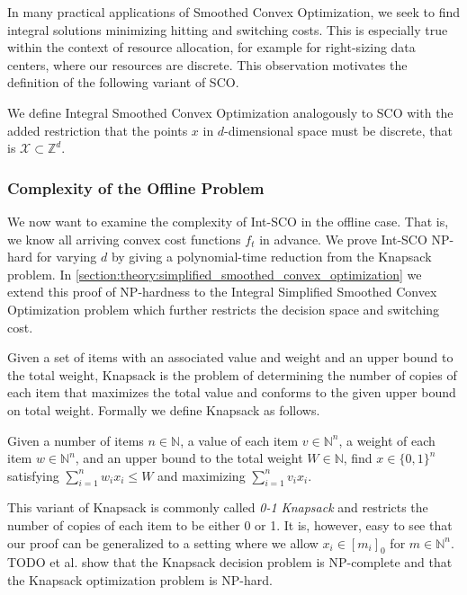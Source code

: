 In many practical applications of Smoothed Convex Optimization, we seek to find integral solutions minimizing hitting and switching costs. This is especially true within the context of resource allocation, for example for right-sizing data centers, where our resources are discrete. This observation motivates the definition of the following variant of SCO.

\begin{problem}
We define Integral Smoothed Convex Optimization analogously to SCO with the added restriction that the points $x$ in $d$-dimensional space must be discrete, that is $\mathcal{X} \subset \mathbb{Z}^d$.
\end{problem}

\subsubsection{Complexity of the Offline Problem}

We now want to examine the complexity of Int-SCO in the offline case. That is, we know all arriving convex cost functions $f_t$ in advance. We prove Int-SCO NP-hard for varying $d$ by giving a polynomial-time reduction from the Knapsack problem. In \autoref{section:theory:simplified_smoothed_convex_optimization} we extend this proof of NP-hardness to the Integral Simplified Smoothed Convex Optimization problem which further restricts the decision space and switching cost.

Given a set of items with an associated value and weight and an upper bound to the total weight, Knapsack is the problem of determining the number of copies of each item that maximizes the total value and conforms to the given upper bound on total weight. Formally we define Knapsack as follows.

\begin{problem}[Knapsack (KP)]
Given a number of items $n \in \mathbb{N}$, a value of each item $v \in \mathbb{N}^n$, a weight of each item $w \in \mathbb{N}^n$, and an upper bound to the total weight $W \in \mathbb{N}$, find $x \in \{0,1\}^n$ satisfying $\sum_{i = 1}^n w_i x_i \leq W$ and maximizing $\sum_{i=1}^n v_i x_i$.
\end{problem}

This variant of Knapsack is commonly called \textit{0-1 Knapsack} and restricts the number of copies of each item to be either 0 or 1. It is, however, easy to see that our proof can be generalized to a setting where we allow $x_i \in [m_i]_0$ for $m \in \mathbb{N}^n$. TODO et al. show that the Knapsack decision problem is NP-complete and that the Knapsack optimization problem is NP-hard.

